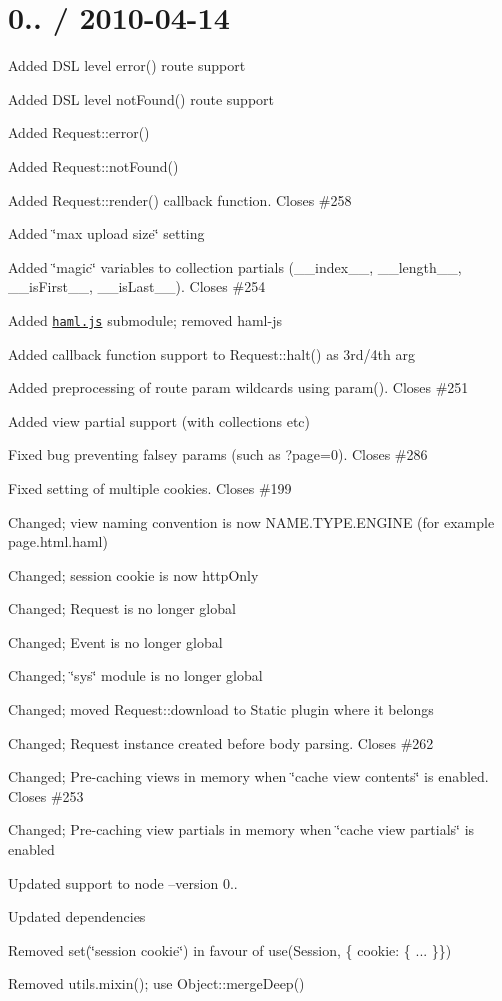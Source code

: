 \section*{0.. / 2010-\/04-\/14 }


\begin{DoxyItemize}
\item Added D\+S\+L level error() route support
\item Added D\+S\+L level not\+Found() route support
\item Added Request\+::error()
\item Added Request\+::not\+Found()
\item Added Request\+::render() callback function. Closes \#258
\item Added \char`\"{}max upload size\char`\"{} setting
\item Added \char`\"{}magic\char`\"{} variables to collection partials (\+\_\+\+\_\+index\+\_\+\+\_\+, \+\_\+\+\_\+length\+\_\+\+\_\+, \+\_\+\+\_\+is\+First\+\_\+\+\_\+, \+\_\+\+\_\+is\+Last\+\_\+\+\_\+). Closes \#254
\item Added \href{http://github.com/visionmedia/haml.js}{\tt haml.\+js} submodule; removed haml-\/js
\item Added callback function support to Request\+::halt() as 3rd/4th arg
\item Added preprocessing of route param wildcards using param(). Closes \#251
\item Added view partial support (with collections etc)
\item Fixed bug preventing falsey params (such as ?page=0). Closes \#286
\item Fixed setting of multiple cookies. Closes \#199
\item Changed; view naming convention is now N\+A\+M\+E.\+T\+Y\+P\+E.\+E\+N\+G\+I\+N\+E (for example page.\+html.\+haml)
\item Changed; session cookie is now http\+Only
\item Changed; Request is no longer global
\item Changed; Event is no longer global
\item Changed; \char`\"{}sys\char`\"{} module is no longer global
\item Changed; moved Request\+::download to Static plugin where it belongs
\item Changed; Request instance created before body parsing. Closes \#262
\item Changed; Pre-\/caching views in memory when \char`\"{}cache view contents\char`\"{} is enabled. Closes \#253
\item Changed; Pre-\/caching view partials in memory when \char`\"{}cache view partials\char`\"{} is enabled
\item Updated support to node --version 0..
\item Updated dependencies
\item Removed set(\char`\"{}session cookie\char`\"{}) in favour of use(Session, \{ cookie\+: \{ ... \}\})
\item Removed utils.\+mixin(); use Object\+::merge\+Deep()
\end{DoxyItemize}

